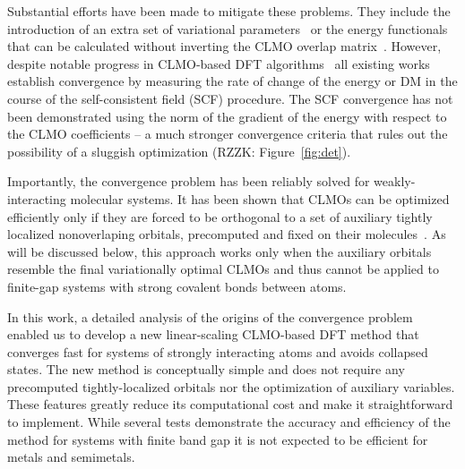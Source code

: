 \documentclass[aps,prl,twocolumn,reprint,amsmath,amssymb]{revtex4-1}
\begin{document}
Substantial efforts have been made to mitigate these problems. 
They include the introduction of an extra set of variational parameters~\cite{yang1997absolute,burger2008linear, peng2013effective} or the energy functionals that can be calculated without inverting the CLMO overlap matrix~\cite{mauri1993orbital,kim1995total,ordejon1995linear}. 
However, despite notable progress in CLMO-based DFT algorithms~\cite{fattebert2004linear, fattebert2006linear, osei2014accurate} all existing works establish convergence by measuring the rate of change of the energy or DM in the course of the self-consistent field (SCF) procedure. 
The SCF convergence has not been demonstrated using the norm of the gradient of the energy with respect to the CLMO coefficients -- a much stronger convergence criteria that rules out the possibility of a sluggish optimization (RZZK: Figure~\ref{fig:det}).

Importantly, the convergence problem has been reliably solved for weakly-interacting molecular systems. 
It has been shown that CLMOs can be optimized efficiently only if they are forced to be orthogonal to a set of auxiliary tightly localized nonoverlaping orbitals, precomputed and fixed on their molecules~\cite{tsuchida2007augmented, tsuchida2008ab, khaliullin2013efficient}. 
As will be discussed below, this approach works only when the auxiliary orbitals resemble the final variationally optimal CLMOs and thus cannot be applied to finite-gap systems with strong covalent bonds between atoms. 

In this work, a detailed analysis of the origins of the convergence problem enabled us to develop a new linear-scaling CLMO-based DFT method that converges fast for systems of strongly interacting atoms and avoids collapsed states. The new method is conceptually simple and does not require any precomputed tightly-localized orbitals nor the optimization of auxiliary variables. These features greatly reduce its computational cost and make it straightforward to implement. While several tests demonstrate the accuracy and efficiency of the method for systems with finite band gap it is not expected to be efficient for metals and semimetals.

\end{document}
